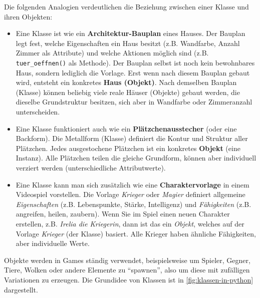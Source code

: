 Die folgenden Analogien verdeutlichen die Beziehung zwischen einer Klasse und ihren Objekten:
\begin{itemize}
	\item Eine Klasse ist wie ein \textbf{Architektur-Bauplan} eines Hauses. Der Bauplan legt fest, welche Eigenschaften ein Haus besitzt (z.B. Wandfarbe, Anzahl Zimmer als Attribute) und welche Aktionen möglich sind (z.B. \lstinline|tuer_oeffnen()| als Methode). Der Bauplan selbst ist noch kein bewohnbares Haus, sondern lediglich die Vorlage. Erst wenn nach diesem Bauplan gebaut wird, entsteht ein konkretes \textbf{Haus (Objekt)}. Nach demselben Bauplan (Klasse) können beliebig viele reale Häuser (Objekte) gebaut werden, die dieselbe Grundstruktur besitzen, sich aber in Wandfarbe oder Zimmeranzahl unterscheiden.

	\item Eine Klasse funktioniert auch wie ein \textbf{Plätzchenausstecher} (oder eine Backform). Die Metallform (Klasse) definiert die Kontur und Struktur aller Plätzchen. Jedes ausgestochene Plätzchen ist ein konkretes \textbf{Objekt} (eine Instanz). Alle Plätzchen teilen die gleiche Grundform, können aber individuell verziert werden (unterschiedliche Attributwerte).

	\item Eine Klasse kann man sich zusätzlich wie eine \textbf{Charaktervorlage} in einem Videospiel vorstellen. Die Vorlage \textit{Krieger} oder \textit{Magier} definiert allgemeine \textit{Eigenschaften} (z.B. Lebenspunkte, Stärke, Intelligenz) und \textit{Fähigkeiten} (z.B. angreifen, heilen, zaubern). Wenn Sie im Spiel einen neuen Charakter erstellen, z.B. \textit{Irelia die Kriegerin}, dann ist das ein \textit{Objekt}, welches auf der Vorlage \textit{Krieger} (der Klasse) basiert. Alle Krieger haben ähnliche Fähigkeiten, aber individuelle Werte.
\end{itemize}

Objekte werden in Games ständig verwendet, beispielsweise um Spieler, Gegner, Tiere, Wolken oder andere Elemente zu \enquote{spawnen}, also um diese mit zufälligen Variationen zu erzeugen. Die Grundidee von Klassen ist in \cref{fig:klassen-in-python} dargestellt.

